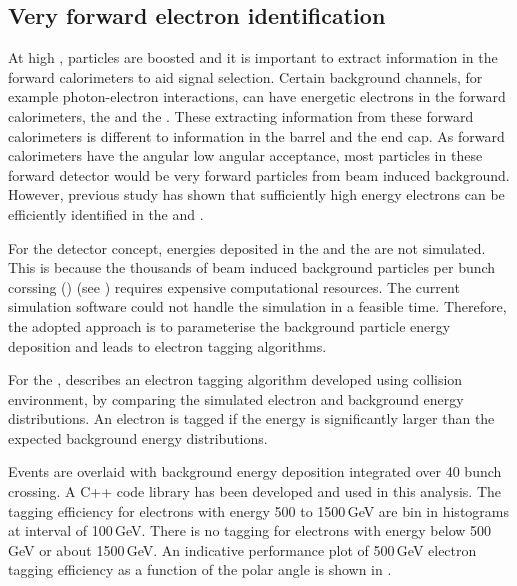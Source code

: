 \subsection{Very forward electron identification}
\label{sec:doubleHiggsForwardElectron}
At high \sqrtS, particles are boosted and it is important to extract information in the forward calorimeters to aid signal selection. Certain background channels, for example photon-electron interactions, can have energetic electrons in  the forward calorimeters, the \LumiCAL and the \BeamCAL. These extracting information from these forward calorimeters is different to information in the barrel and the end cap. As forward calorimeters have the angular low angular acceptance, most particles in these forward detector would be very forward particles from beam induced background. However, previous study \cite{sailer2012radiation} has shown that sufficiently high energy electrons can be efficiently identified in the \BeamCAL and \LumiCAL.

For the \CLICILD detector concept, energies deposited in the \LumiCAL and the \BeamCAL are not simulated. This is because the thousands of beam induced background particles per bunch corssing () (see \Section{}) requires expensive computational resources. The current simulation software could not handle the simulation in a feasible time. Therefore, the adopted approach is to parameterise the background particle energy deposition and leads to electron tagging algorithms.

For the \BeamCAL, \cite{Sailer:2017onh} describes an electron tagging algorithm developed using  collision environment, by comparing the simulated electron and background energy distributions. An electron is tagged if the energy is significantly larger than the expected background energy distributions.

Events are overlaid with background energy deposition integrated over 40 bunch crossing. A C++ code library has been developed and used in this analysis. The tagging efficiency for electrons with energy 500 to 1500\,GeV are bin in histograms at interval of 100\,GeV. There is no tagging for electrons with energy below 500\,GeV or about 1500\,GeV. An indicative performance plot of 500\,GeV electron tagging efficiency as a function of the polar angle is shown in .


